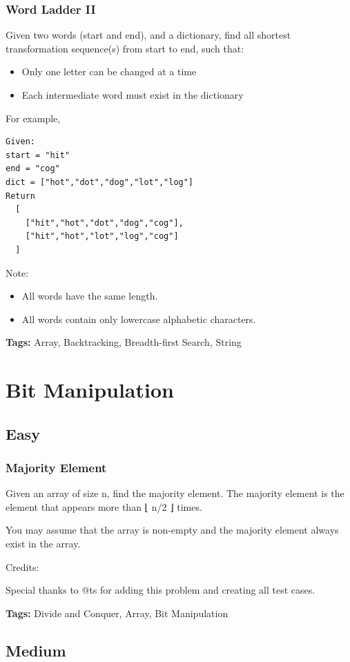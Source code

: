 \documentclass[12pt]{book}
\begin{document}
\subsection{Word Ladder II}
\label{sec-16-4-13}
Given two words (start and end), and a dictionary, find all shortest transformation sequence(s) from start to end, such that:
\begin{itemize}
\item Only one letter can be changed at a time
\item Each intermediate word must exist in the dictionary
\end{itemize}
For example,
\lstset{language=java,label= ,caption= ,numbers=none}
\begin{lstlisting}
Given:
start = "hit"
end = "cog"
dict = ["hot","dot","dog","lot","log"]
Return
  [
    ["hit","hot","dot","dog","cog"],
    ["hit","hot","lot","log","cog"]
  ]
\end{lstlisting}
Note:
\begin{itemize}
\item All words have the same length.
\item All words contain only lowercase alphabetic characters.
\end{itemize}
\textbf{Tags:} Array, Backtracking, Breadth-first Search, String

\chapter{Bit Manipulation}
\label{sec-17}
\section{Easy}
\label{sec-17-1}
\subsection{Majority Element}
\label{sec-17-1-1}
Given an array of size n, find the majority element. The majority element is the element that appears more than ⌊ n/2 ⌋ times.

You may assume that the array is non-empty and the majority element always exist in the array.

Credits:

Special thanks to @ts for adding this problem and creating all test cases.

\textbf{Tags:} Divide and Conquer, Array, Bit Manipulation

\section{Medium}
\label{sec-17-2}
\end{document}
